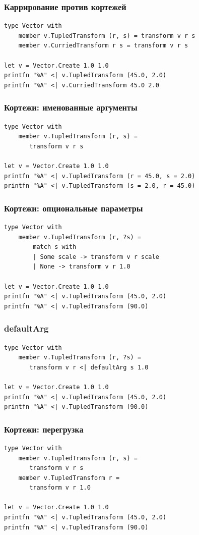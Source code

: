 \documentclass{../../slides-style}
\begin{document}
    \begin{frame}[fragile]
        \frametitle{Каррирование против кортежей}
        \begin{verbatim}
type Vector with
    member v.TupledTransform (r, s) = transform v r s
    member v.CurriedTransform r s = transform v r s

let v = Vector.Create 1.0 1.0
printfn "%A" <| v.TupledTransform (45.0, 2.0)
printfn "%A" <| v.CurriedTransform 45.0 2.0
        \end{verbatim}
    \end{frame}

    \begin{frame}[fragile]
        \frametitle{Кортежи: именованные аргументы}
        \begin{verbatim}
type Vector with
    member v.TupledTransform (r, s) = 
       transform v r s

let v = Vector.Create 1.0 1.0
printfn "%A" <| v.TupledTransform (r = 45.0, s = 2.0)
printfn "%A" <| v.TupledTransform (s = 2.0, r = 45.0)
        \end{verbatim}
    \end{frame}

    \begin{frame}[fragile]
        \frametitle{Кортежи: опциональные параметры}
        \begin{verbatim}
type Vector with
    member v.TupledTransform (r, ?s) = 
        match s with
        | Some scale -> transform v r scale
        | None -> transform v r 1.0

let v = Vector.Create 1.0 1.0
printfn "%A" <| v.TupledTransform (45.0, 2.0)
printfn "%A" <| v.TupledTransform (90.0)
        \end{verbatim}
    \end{frame}

    \begin{frame}[fragile]
        \frametitle{defaultArg}
        \begin{verbatim}
type Vector with
    member v.TupledTransform (r, ?s) = 
       transform v r <| defaultArg s 1.0

let v = Vector.Create 1.0 1.0
printfn "%A" <| v.TupledTransform (45.0, 2.0)
printfn "%A" <| v.TupledTransform (90.0)
        \end{verbatim}
    \end{frame}

    \begin{frame}[fragile]
        \frametitle{Кортежи: перегрузка}
        \begin{verbatim}
type Vector with
    member v.TupledTransform (r, s) = 
       transform v r s
    member v.TupledTransform r = 
       transform v r 1.0

let v = Vector.Create 1.0 1.0
printfn "%A" <| v.TupledTransform (45.0, 2.0)
printfn "%A" <| v.TupledTransform (90.0)
        \end{verbatim}
    \end{frame}
\end{document}
